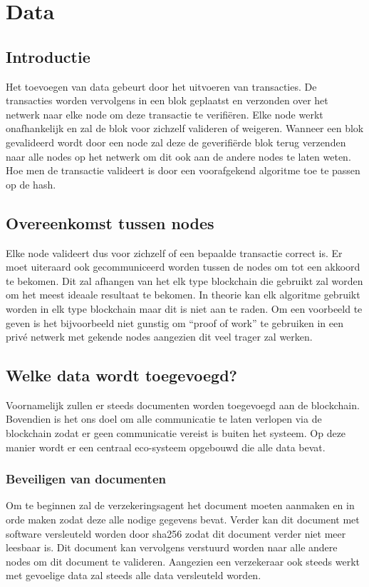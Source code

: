 \chapter{Data}
\label{ch:add-to-blockchain}

\section{Introductie}
Het toevoegen van data gebeurt door het uitvoeren van transacties. De transacties worden vervolgens in een blok geplaatst en verzonden over het netwerk naar elke node om deze transactie te verifiëren. Elke node werkt onafhankelijk en zal de blok voor zichzelf valideren of weigeren. Wanneer een blok gevalideerd wordt door een node zal deze de geverifiërde blok terug verzenden naar alle nodes op het netwerk om dit ook aan de andere nodes te laten weten. Hoe men de transactie valideert is door een voorafgekend algoritme toe te passen op de hash. 

\section{Overeenkomst tussen nodes}
Elke node valideert dus voor zichzelf of een bepaalde transactie correct is. Er moet uiteraard ook gecommuniceerd worden tussen de nodes om tot een akkoord te bekomen. Dit zal afhangen van het elk type blockchain die gebruikt zal worden om het meest ideaale resultaat te bekomen. In theorie kan elk algoritme gebruikt worden in elk type blockchain maar dit is niet aan te raden. Om een voorbeeld te geven is het bijvoorbeeld niet gunstig om ``proof of work'' te gebruiken in een privé netwerk met gekende nodes aangezien dit veel trager zal werken.

\section{Welke data wordt toegevoegd?}
Voornamelijk zullen er steeds documenten worden toegevoegd aan de blockchain. Bovendien is het ons doel om alle communicatie te laten verlopen via de blockchain zodat er geen communicatie vereist is buiten het systeem. Op deze manier wordt er een centraal eco-systeem opgebouwd die alle data bevat.

\subsection{Beveiligen van documenten}
Om te beginnen zal de verzekeringsagent het document moeten aanmaken en in orde maken zodat deze alle nodige gegevens bevat. Verder kan dit document met software versleuteld worden door sha256 zodat dit document verder niet meer leesbaar is. Dit document kan vervolgens verstuurd worden naar alle andere nodes om dit document te valideren. Aangezien een verzekeraar ook steeds werkt met gevoelige data zal steeds alle data versleuteld worden. 

